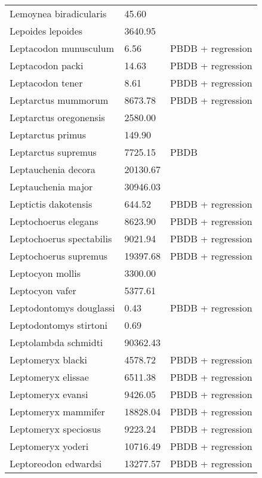 \documentclass{article}
\begin{document}
\begin{center}
\begin{longtable}{p{} p{} p{}}
    Lemoynea biradicularis & 45.60 & \cite{Tomiya2013} \\ 
    Lepoides lepoides & 3640.95 & \cite{Tomiya2013} \\ 
    Leptacodon munusculum & 6.56 & PBDB + regression \\ 
    Leptacodon packi & 14.63 & PBDB + regression \\ 
    Leptacodon tener & 8.61 & PBDB + regression \\ 
    Leptarctus mummorum & 8673.78 & PBDB + regression \\ 
    Leptarctus oregonensis & 2580.00 & \cite{McKenna2011} \\ 
    Leptarctus primus & 149.90 & \cite{Tomiya2013} \\ 
    Leptarctus supremus & 7725.15 & PBDB \\ 
    Leptauchenia decora & 20130.67 & \cite{Tomiya2013} \\ 
    Leptauchenia major & 30946.03 & \cite{Tomiya2013} \\ 
    Leptictis dakotensis & 644.52 & PBDB + regression \\ 
    Leptochoerus elegans & 8623.90 & PBDB + regression \\ 
    Leptochoerus spectabilis & 9021.94 & PBDB + regression \\ 
    Leptochoerus supremus & 19397.68 & PBDB + regression \\ 
    Leptocyon mollis & 3300.00 & \cite{McKenna2011} \\ 
    Leptocyon vafer & 5377.61 & \cite{Tomiya2013} \\ 
    Leptodontomys douglassi & 0.43 & PBDB + regression \\ 
    Leptodontomys stirtoni & 0.69 & \cite{Stock1937} \\ 
    Leptolambda schmidti & 90362.43 & \cite{Zack2005} \\ 
    Leptomeryx blacki & 4578.72 & PBDB + regression \\ 
    Leptomeryx elissae & 6511.38 & PBDB + regression \\ 
    Leptomeryx evansi & 9426.05 & PBDB + regression \\ 
    Leptomeryx mammifer & 18828.04 & PBDB + regression \\ 
    Leptomeryx speciosus & 9223.24 & PBDB + regression \\ 
    Leptomeryx yoderi & 10716.49 & PBDB + regression \\ 
    Leptoreodon edwardsi & 13277.57 & PBDB + regression \\ 

\end{longtable}
\end{center}
\end{document}
